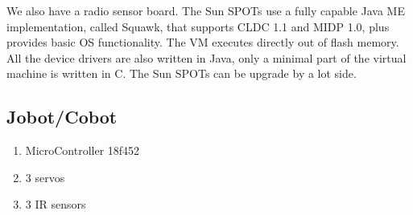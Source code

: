\documentclass[a4paper,10pt]{article} %
\begin{document}
We also have a radio sensor board. The Sun SPOTs use a fully capable Java ME
implementation, called Squawk, that supports CLDC 1.1 and MIDP 1.0, plus
provides basic OS functionality. The VM executes directly out of flash memory.
All the device drivers are also written in Java, only a minimal part of the
virtual machine is written in C. The Sun SPOTs can be upgrade by a lot side.


\subsection{Jobot/Cobot} %
\label{app:cobot}

\begin{enumerate}
	\item MicroController 18f452
	\item 3 servos
	\item 3 IR sensors
\end{enumerate}





\end{document}
